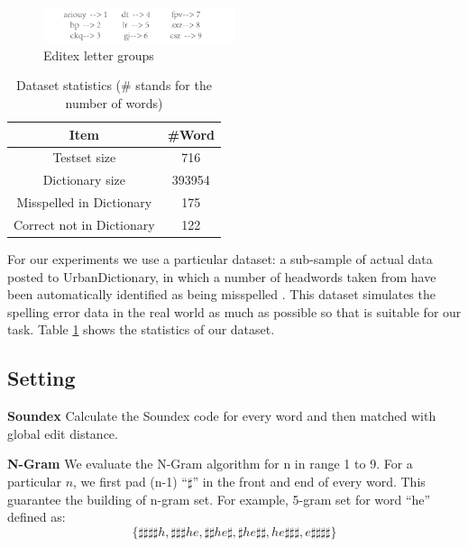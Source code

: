 \documentclass[11pt]{article}
\begin{document}
\begin{figure}
	\centering
	\includegraphics[width=0.5\textwidth]{img/editex.pdf}
	\caption{Editex letter groups}
	\label{fig:editex}
\end{figure}

\begin{table}
	\centering
	\begin{tabular}{c|c}
		\hline
		Item & \#Word \\
		\hline
		Testset size & 716 \\
		\hline
		Dictionary  size & 393954 \\
		\hline
		Misspelled in Dictionary & 175 \\
		\hline
		Correct not in Dictionary & 122 \\
		\hline
	\end{tabular}
	\caption{Dataset statistics (\# stands for the number of words)}
	\label{tab:dataset}
\end{table}

For our experiments we use a particular dataset:  a sub-sample of actual data posted to UrbanDictionary, in which a number of headwords taken from have been automatically identified as being misspelled \cite{Saphra2016EvaluatingIW}. This dataset simulates the spelling error data in the real world as much as possible so that is suitable for our task. Table \ref{tab:dataset} shows the statistics of our dataset.

\subsection{Setting} 

\noindent\textbf{Soundex} Calculate the Soundex code for every word and then matched with global edit distance.

\noindent\textbf{N-Gram} We evaluate the N-Gram algorithm for n in range 1 to 9. For a particular $n$, we first pad (n-1) ``$\sharp$'' in the front and end of every word. This guarantee the building of n-gram set. For example, 5-gram set for word ``he'' defined as: 
\begin{equation}
\{\sharp\sharp\sharp\sharp h, \sharp\sharp\sharp he, \sharp\sharp he\sharp, \sharp he\sharp\sharp, he\sharp\sharp\sharp, e\sharp\sharp\sharp\sharp\}
\end{equation}
\end{document}
